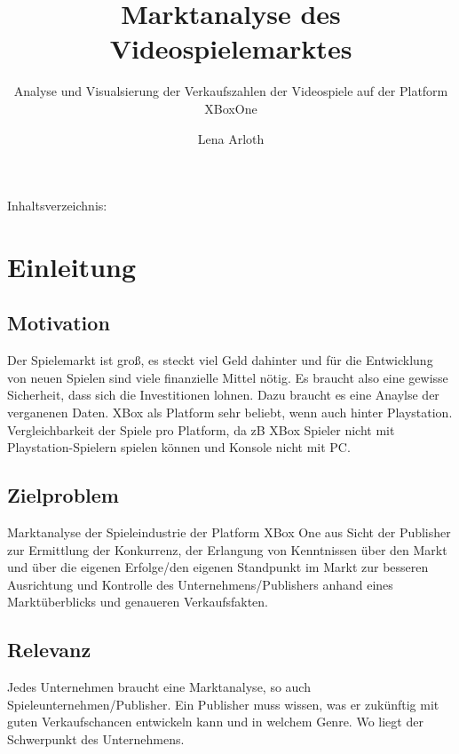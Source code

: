 \documentclass[usegeometry=true]{scrartcl}
\begin{document}
\subject{Projektbericht zum Modul Information Retrieval und Visualisierung Sommersemester 2022}
\title{Marktanalyse des Videospielemarktes}
\subtitle{Analyse und Visualsierung der Verkaufszahlen der Videospiele auf der Platform XBoxOne}
\author{Lena Arloth}%
\maketitle%
Inhaltsverzeichnis:
\tableofcontents

\section{Einleitung}
\subsection{Motivation} 
Der Spielemarkt ist groß, es steckt viel Geld dahinter und für die Entwicklung von neuen Spielen sind viele finanzielle Mittel nötig. 
Es braucht also eine gewisse Sicherheit, dass sich die Investitionen lohnen. 
Dazu braucht es eine Anaylse der verganenen Daten. XBox als Platform sehr beliebt, wenn auch hinter Playstation. 
Vergleichbarkeit der Spiele pro Platform, da zB XBox Spieler nicht mit Playstation-Spielern spielen können und Konsole nicht mit PC.
\subsection{Zielproblem} 
Marktanalyse der Spieleindustrie der Platform XBox One aus Sicht der Publisher zur Ermittlung der Konkurrenz, der Erlangung von Kenntnissen über den Markt und über die eigenen Erfolge/den eigenen Standpunkt im Markt zur besseren Ausrichtung und Kontrolle des Unternehmens/Publishers anhand eines Marktüberblicks und genaueren Verkaufsfakten.
\subsection{Relevanz} 
Jedes Unternehmen braucht eine Marktanalyse, so auch Spieleunternehmen/Publisher. 
Ein Publisher muss wissen, was er zukünftig mit guten Verkaufschancen entwickeln kann und in welchem Genre. Wo liegt der Schwerpunkt des Unternehmens.
\end{document}
